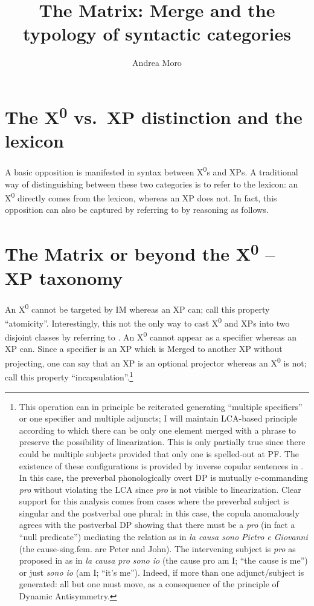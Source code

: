 \documentclass[output=paper]{langsci/langscibook}
\author{Andrea Moro\affiliation{University School for Advanced Studies IUSS, Pavia}}
\title{The Matrix: Merge and the typology of syntactic categories}
\begin{document}
\glsresetall

\section{The X\textsuperscript{0} vs.\ XP distinction and the lexicon}

A basic opposition is manifested in syntax between X\textsuperscript{0}s and
XPs. A traditional way of distinguishing between these two categories is to
refer to the lexicon: an X\textsuperscript{0} directly comes from the lexicon,
whereas an XP does not. In fact, this opposition can also be captured by
referring to  by reasoning as follows.\largerpage[-1]

\section{The Matrix or beyond the X\textsuperscript{0} -- XP taxonomy}

An X\textsuperscript{0} cannot be targeted by \gls{IM} whereas an XP can; call
this property “atomicity”. Interestingly, this not the only way to cast
X\textsuperscript{0} and XPs into two disjoint classes by referring to
.  An X\textsuperscript{0} cannot appear as a specifier whereas an
XP can.  Since a specifier is an XP which is Merged to another XP without
projecting, one can say that an XP is an optional projector whereas an
X\textsuperscript{0} is not; call this property “incapsulation”.\footnote{This
    operation can in principle be reiterated generating “multiple specifiers”
    or one specifier and multiple adjuncts; I will maintain 
    \gls{LCA}-based principle according to which there can be
    only one element merged with a phrase to preserve the possibility of
    linearization. This is only partially true since there could be multiple
    subjects provided that only one is spelled-out at \gls{PF}. The existence
    of these configurations is provided by inverse copular sentences
    in . In this case, the preverbal phonologically overt DP is mutually
    c-commanding \emph{pro} without violating the \gls{LCA} since \emph{pro} is
    not visible to linearization. Clear support for this analysis comes from
    cases where the preverbal subject is singular and the postverbal one
    plural: in this case, the copula anomalously agrees with the postverbal DP
    showing that there must be a \emph{pro} (in fact a “null predicate”)
    mediating the  relation as in \emph{la causa sono Pietro e
    Giovanni} (the cause-sing.fem.  are Peter and John). The intervening
    subject is \emph{pro} as proposed in \citet{Moro1997} as in \emph{la causa
    pro sono io} (the cause pro am I; “the cause is me”) or just \emph{sono io}
    (am I; “it's me”). Indeed, if more than one adjunct/subject is generated:
all but one must move, as a consequence of the principle of Dynamic
Antisymmetry.}
\end{document}

